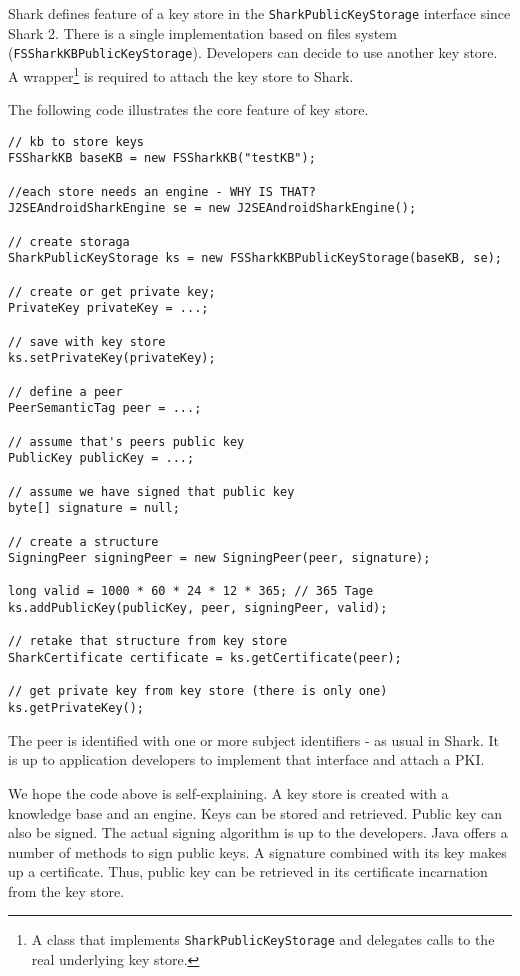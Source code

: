 Shark defines feature of a key store in the {\tt SharkPublicKeyStorage} interface since Shark 2. There is a single implementation based on files system ({\tt FSSharkKBPublicKeyStorage}). Developers can decide to use another key store. A wrapper\footnote{A class that implements {\tt SharkPublicKeyStorage} and delegates calls to the real underlying key store.} is required to attach the key store to Shark.

The following code illustrates the core feature of key store.

\begin{verbatim}
// kb to store keys
FSSharkKB baseKB = new FSSharkKB("testKB");

//each store needs an engine - WHY IS THAT?
J2SEAndroidSharkEngine se = new J2SEAndroidSharkEngine();

// create storaga
SharkPublicKeyStorage ks = new FSSharkKBPublicKeyStorage(baseKB, se);

// create or get private key;
PrivateKey privateKey = ...;

// save with key store
ks.setPrivateKey(privateKey);

// define a peer
PeerSemanticTag peer = ...;

// assume that's peers public key
PublicKey publicKey = ...;

// assume we have signed that public key
byte[] signature = null;

// create a structure
SigningPeer signingPeer = new SigningPeer(peer, signature);

long valid = 1000 * 60 * 24 * 12 * 365; // 365 Tage
ks.addPublicKey(publicKey, peer, signingPeer, valid);

// retake that structure from key store
SharkCertificate certificate = ks.getCertificate(peer);

// get private key from key store (there is only one)
ks.getPrivateKey();
\end{verbatim}

The peer is identified with one or more subject identifiers - as usual in Shark.
It is up to application developers to implement that interface and attach a PKI.

We hope the code above is self-explaining. A key store is created with a knowledge base and an engine. Keys can be stored and retrieved. Public key can also be signed. The actual signing algorithm is up to the developers. Java offers a number of methods to sign public keys. A signature combined with its key makes up a certificate. Thus, public key can be retrieved in its certificate incarnation from the key store.

